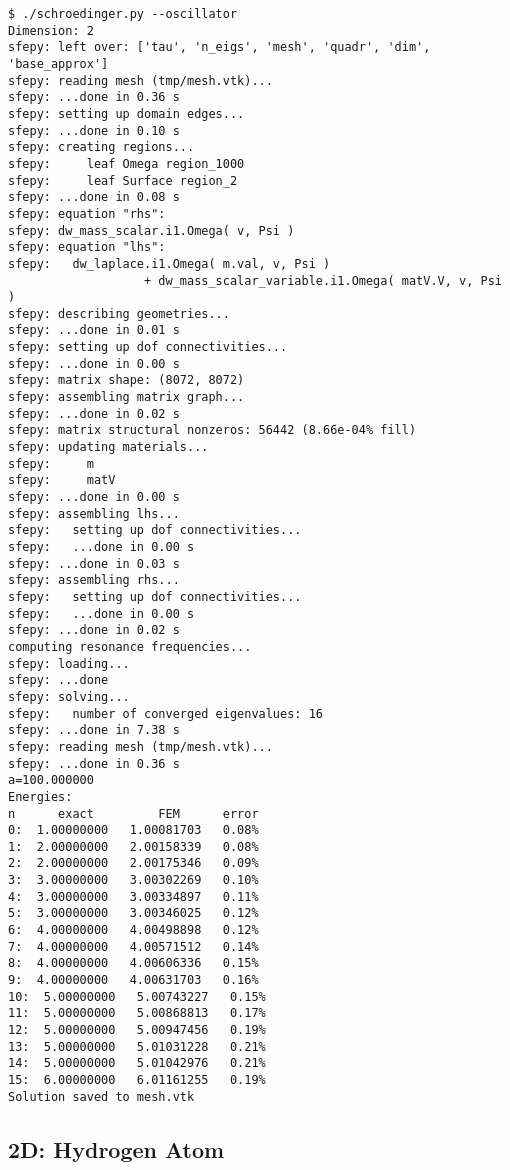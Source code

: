 \begin{lstlisting}
$ ./schroedinger.py --oscillator
Dimension: 2
sfepy: left over: ['tau', 'n_eigs', 'mesh', 'quadr', 'dim', 'base_approx']
sfepy: reading mesh (tmp/mesh.vtk)...
sfepy: ...done in 0.36 s
sfepy: setting up domain edges...
sfepy: ...done in 0.10 s
sfepy: creating regions...
sfepy:     leaf Omega region_1000
sfepy:     leaf Surface region_2
sfepy: ...done in 0.08 s
sfepy: equation "rhs":
sfepy: dw_mass_scalar.i1.Omega( v, Psi )
sfepy: equation "lhs":
sfepy:   dw_laplace.i1.Omega( m.val, v, Psi )
                   + dw_mass_scalar_variable.i1.Omega( matV.V, v, Psi )
sfepy: describing geometries...
sfepy: ...done in 0.01 s
sfepy: setting up dof connectivities...
sfepy: ...done in 0.00 s
sfepy: matrix shape: (8072, 8072)
sfepy: assembling matrix graph...
sfepy: ...done in 0.02 s
sfepy: matrix structural nonzeros: 56442 (8.66e-04% fill)
sfepy: updating materials...
sfepy:     m
sfepy:     matV
sfepy: ...done in 0.00 s
sfepy: assembling lhs...
sfepy:   setting up dof connectivities...
sfepy:   ...done in 0.00 s
sfepy: ...done in 0.03 s
sfepy: assembling rhs...
sfepy:   setting up dof connectivities...
sfepy:   ...done in 0.00 s
sfepy: ...done in 0.02 s
computing resonance frequencies...
sfepy: loading...
sfepy: ...done
sfepy: solving...
sfepy:   number of converged eigenvalues: 16
sfepy: ...done in 7.38 s
sfepy: reading mesh (tmp/mesh.vtk)...
sfepy: ...done in 0.36 s
a=100.000000
Energies:
n      exact         FEM      error
0:  1.00000000   1.00081703   0.08%
1:  2.00000000   2.00158339   0.08%
2:  2.00000000   2.00175346   0.09%
3:  3.00000000   3.00302269   0.10%
4:  3.00000000   3.00334897   0.11%
5:  3.00000000   3.00346025   0.12%
6:  4.00000000   4.00498898   0.12%
7:  4.00000000   4.00571512   0.14%
8:  4.00000000   4.00606336   0.15%
9:  4.00000000   4.00631703   0.16%
10:  5.00000000   5.00743227   0.15%
11:  5.00000000   5.00868813   0.17%
12:  5.00000000   5.00947456   0.19%
13:  5.00000000   5.01031228   0.21%
14:  5.00000000   5.01042976   0.21%
15:  6.00000000   6.01161255   0.19%
Solution saved to mesh.vtk
\end{lstlisting}

\subsection{2D: Hydrogen Atom}

